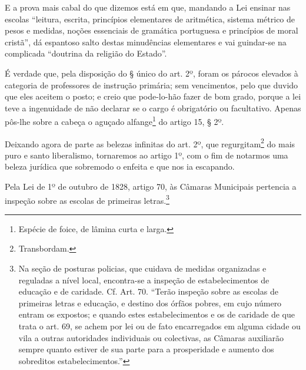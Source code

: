 E a prova mais cabal do que dizemos está em que, mandando a Lei ensinar
nas escolas ``leitura, escrita, princípios elementares de aritmética,
sistema métrico de pesos e medidas, noções essenciais de gramática
portuguesa e princípios de moral cristã'', dá espantoso salto destas
minudências elementares e vai guindar-se na complicada ``doutrina da
religião do Estado''.

É verdade que, pela disposição do § único do art. 2º, foram os párocos
elevados à categoria de professores de instrução primária; sem
vencimentos, pelo que duvido que eles aceitem o posto; e creio que
pode-lo-hão fazer de bom grado, porque a lei teve a ingenuidade de não
declarar se o cargo é obrigatório ou facultativo. Apenas pôs-lhe sobre a
cabeça o aguçado alfange\footnote{Espécie de foice, de lâmina curta e
  larga.} do artigo 15, § 2º.

Deixando agora de parte as belezas infinitas do art. 2º, que
regurgitam\footnote{Transbordam.} do mais puro e santo liberalismo,
tornaremos ao artigo 1º, com o fim de notarmos uma beleza jurídica que
sobremodo o enfeita e que nos ia escapando.

Pela Lei de 1º de outubro de 1828, artigo 70, às Câmaras Municipais
pertencia a inspeção sobre as escolas de primeiras letras.\footnote{Na
  seção de posturas policias, que cuidava de medidas organizadas e
  reguladas a nível local, encontra-se a inspeção de estabelecimentos de
  educação e de caridade. Cf. Art. 70. ``Terão inspeção sobre as escolas
  de primeiras letras e educação, e destino dos órfãos pobres, em cujo
  número entram os expostos; e quando estes estabelecimentos e os de
  caridade de que trata o art. 69, se achem por lei ou de fato
  encarregados em alguma cidade ou vila a outras autoridades individuais
  ou colectivas, as Câmaras auxiliarão sempre quanto estiver de sua
  parte para a prosperidade e aumento dos sobreditos estabelecimentos.''}

